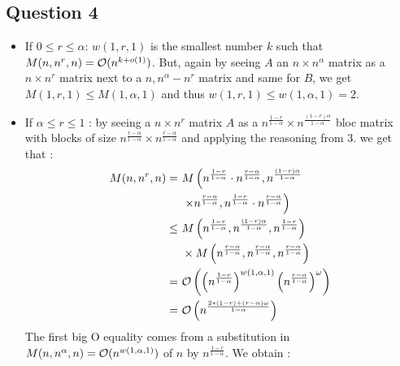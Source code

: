 \documentclass{Cours}
\begin{document}
        \subsection{Question 4}
            \begin{itemize}
                \item If $0 \leq r \leq \alpha$: $w(1, r, 1)$ is the smallest number $k$ such that $M(n, n^{r}, n) = \mathcal{O}(n^{k + o(1)})$. But, again by seeing $A$ an $n\times n^{\alpha}$ matrix as a $n\times n^{r}$ matrix next to a $n, n^{\alpha} - n^{r}$ matrix and same for $B$, we get $M(1, r, 1) \leq M(1, \alpha, 1)$ and thus $w(1, r, 1) \leq w(1, \alpha, 1) = 2$.
                \item If $\alpha \leq r \leq 1$ : by seeing a $n \times n^{r}$ matrix $A$ as a $n^{\frac{1 - r}{1 - \alpha}} \times n^{\frac{\left(1 - r\right)\alpha}{1 - \alpha}}$ bloc matrix with blocks of size $n^{\frac{r - \alpha}{1 - \alpha }}\times n^{\frac{r - \alpha}{1 - \alpha}}$ and applying the reasoning from 3. we get that : 
                \[
                    \begin{aligned}
                        M(n, n^{r}, n) = &\ M\left(n^{\frac{1 - r}{1 - \alpha}} \cdot n^{\frac{r - \alpha}{1 - \alpha }}, n^{\frac{\left(1 - r\right)\alpha}{1 - \alpha}}\right.\\ 
                        &\ \left.\times n^{\frac{r - \alpha}{1 - \alpha}}, n^{\frac{1 - r}{1 - \alpha}} \cdot n^{\frac{r - \alpha}{1 - \alpha }}\right)\\
                         \leq&\  M\left(n^{\frac{1 - r}{1 - \alpha}}, n^{\frac{(1 - r)\alpha}{1 - \alpha}}, n^{\frac{1 - r}{1 - \alpha}}\right)\\
                        &\ \times M\left(n^{\frac{r - \alpha}{1 - \alpha}}, n^{\frac{r - \alpha}{1 - \alpha}}, n^{\frac{r - \alpha}{1 - \alpha}}\right)\\
                        = &\ \mathcal{O}\left(\left(n^{\frac{1 - r}{1 - \alpha}}\right)^{{w(1, \alpha, 1)}}\left(n^{\frac{r - \alpha}{1 - \alpha}}\right)^{\omega}\right)\\
                        = &\ \mathcal{O}\left(n^{\frac{2 * (1 - r) + \left(r - \alpha\right) \omega}{1 - \alpha}}\right)
                    \end{aligned}      
                \]
                The first big O equality comes from a substitution in $M(n, n^{\alpha}, n) = \mathcal{O}(n^{w(1, \alpha, 1)})$ of $n$ by $n^{\frac{1 - r}{1 - \alpha}}$.
                We obtain : 
                \[
                    \begin{aligned}

\end{aligned}\]
\end{itemize}
\end{document}
